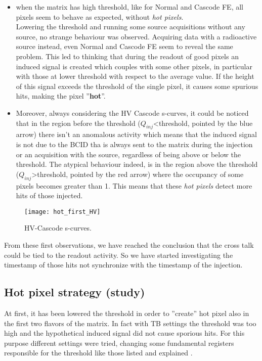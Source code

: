 \begin{itemize}
\item when the matrix has high threshold, like for Normal and Cascode FE, all pixels seem to behave as expected, without \textit{hot pixels}.\\ Lowering the threshold and running some source acquisitions without any source, no strange behaviour was observed. Acquiring data with a radioactive source instead, even Normal and Cascode FE seem to reveal the same problem. This led to thinking that during the readout of good pixels an induced signal is created which couples with some other pixels, in particular with those at lower threshold with respect to the average value. If the height of this signal exceeds the threshold of the single pixel, it causes some spurious hits, making the pixel ''\textbf{hot}''.

\item Moreover, always considering the HV Cascode s-curves, it could be noticed that in the region before the threshold ($Q_{inj}$<threshold, pointed by the blue arrow) there isn't an anomalous activity which means that the induced signal is not due to the BCID tha is always sent to the matrix during the injection or an acquisition with the source, regardless of being above or below the  threshold. The atypical behaviour indeed, is in the region above the threshold ($Q_{inj}$>threshold, pointed by the red arrow) where the occupancy of some pixels becomes greater than 1. This means that these \textit{hot pixels} detect more hits of those injected.

\end{itemize} 

\begin{figure}[h!]
\centering
\texttt{[image: hot\_first\_HV]}
\caption{HV-Cascode s-curves.}
\label{fig:hot_first}
\end{figure}

From these first observations, we have reached the conclusion that the cross talk could be tied to the readout activity. So we have started investigating the timestamp of those hits not synchronize with the timestamp of the injection.


\subsection{Hot pixel strategy (study)}

At first, it has been lowered the threshold in order to ''create'' hot pixel also in the first two flavors of the matrix. In fact with TB settings the threshold was too high and the hypothetical induced signal did not cause sporious hits. For this purpose different settings were tried, changing some fundamental registers responsible for the threshold like those listed and explained . 

